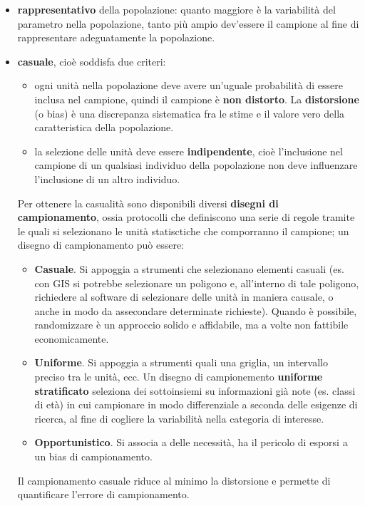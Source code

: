 \documentclass[10pt, draft]{book}
\begin{document}
\begin{itemize}
    \item \textbf{rappresentativo} della popolazione: quanto maggiore è la variabilità del parametro nella popolazione, tanto più ampio dev’essere il campione al fine di rappresentare adeguatamente la popolazione.
    \item \textbf{casuale}, cioè soddisfa due criteri:
    \begin{itemize}
        \item ogni unità nella popolazione deve avere un'uguale probabilità di essere inclusa nel campione, quindi il campione è \textbf{non distorto}.
        La \textbf{distorsione} (o bias) è una discrepanza sistematica fra le stime e il valore vero della caratteristica della popolazione.
        \item la selezione delle unità deve essere \textbf{indipendente}, cioè l'inclusione nel campione di un qualsiasi individuo della popolazione non deve influenzare l'inclusione di un altro individuo.
    \end{itemize}
    Per ottenere la casualità sono disponibili diversi \textbf{disegni di campionamento}, ossia protocolli che definiscono una serie di regole tramite le quali si selezionano le unità statisctiche che comporranno il campione; un disegno di campionamento può essere:
    \begin{itemize}
        \item \textbf{Casuale}. Si appoggia a strumenti che selezionano elementi casuali (es. con GIS si potrebbe selezionare un poligono e, all’interno di tale poligono, richiedere al software di selezionare delle unità in maniera causale, o anche in modo da assecondare determinate richieste). Quando è possibile, randomizzare è un approccio solido e affidabile, ma a volte non fattibile economicamente.
        \item \textbf{Uniforme}. Si appoggia a strumenti quali una griglia, un intervallo preciso tra le unità, ecc. Un disegno di campionemento \textbf{uniforme stratificato} seleziona dei sottoinsiemi su informazioni già note (es. classi di età) in cui campionare in modo differenziale a seconda delle esigenze di ricerca, al fine di cogliere la variabilità nella categoria di interesse.
        \item \textbf{Opportunistico}. Si associa a delle necessità, ha il pericolo di esporsi a un bias di campionamento.
    \end{itemize}
    Il campionamento casuale riduce al minimo la distorsione e permette di quantificare l'errore di campionamento.
\end{itemize}
\end{document}
